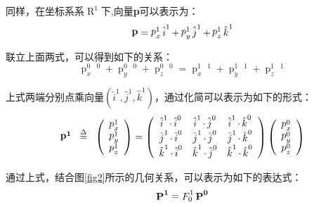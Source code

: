 同样，在坐标系系$\mathop R\nolimits^1 $下,向量{\bf{p}}可以表示为：
\[\mathop {\bf{p}}\limits^{}  = \mathop p\nolimits_x^1 \mathop {\hat i}\nolimits^1  + \mathop p\nolimits_y^1 \mathop
{\hat j}\nolimits^1  + \mathop p\nolimits_z^1 \mathop {\hat k}\nolimits^1 \]

联立上面两式，可以得到如下的关系：
\[\mathop p\nolimits_x^0 \mathop {\hat i}\nolimits^0  + \mathop p\nolimits_y^0 \mathop {\hat j}\nolimits^0  + \mathop p\nolimits_z^0 \mathop {\hat k}\nolimits^0  = \mathop p\nolimits_x^1 \mathop {\hat i}\nolimits^1  + \mathop p\nolimits_y^1 \mathop {\hat j}\nolimits^1  + \mathop p\nolimits_z^1 \mathop {\hat k}\nolimits^1 \]

上式两端分别点乘向量$\left( {{{\hat i}^1},{{\hat j}^1},{{\hat k}^1}} \right)$，通过化简可以表示为如下的形式：
\[\mathop {\bf{p}}\nolimits^{\bf{1}} {\kern 1pt} {\kern 1pt} {\kern 1pt} {\kern 1pt}  \buildrel \Delta \over = {\kern 1pt} {\kern 1pt} {\kern 1pt} {\kern 1pt} \left( \begin{array}{l}
\mathop p\nolimits_x^1 \\
\mathop p\nolimits_y^1 \\
\mathop p\nolimits_z^1
\end{array} \right) = \left( {\begin{array}{*{20}{c}}
{\mathop {\hat i}\nolimits^1  \cdot \mathop {\hat i}\nolimits^0 }&{\mathop {\hat i}\nolimits^1  \cdot \mathop {\hat j}\nolimits^0 }&{\mathop {\hat i}\nolimits^1  \cdot \mathop {\hat k}\nolimits^0 }\\
{\mathop {\hat j}\nolimits^1  \cdot \mathop {\hat i}\nolimits^0 }&{\mathop {\hat j}\nolimits^1  \cdot \mathop {\hat j}\nolimits^0 }&{\mathop {\hat j}\nolimits^1  \cdot \mathop {\hat k}\nolimits^0 }\\
{\mathop {\hat k}\nolimits^1  \cdot \mathop {\hat i}\nolimits^0 }&{\mathop {\hat k}\nolimits^1  \cdot \mathop {\hat j}\nolimits^0 }&{\mathop {\hat k}\nolimits^1  \cdot \mathop {\hat k}\nolimits^0 }
\end{array}} \right)\left( \begin{array}{l}
\mathop p\nolimits_x^0 \\
\mathop p\nolimits_y^0 \\
\mathop p\nolimits_z^0
\end{array} \right)\]

通过上式，结合图\ref{fig2}所示的几何关系，可以表示为如下的表达式：
\begin{equation}\label{1}
\mathop {\bf{P}}\nolimits^{\bf{1}}  = \mathop F\nolimits_0^1 \mathop {\bf{P}}\nolimits^{\bf{0}}
\end{equation}

